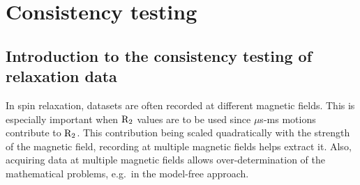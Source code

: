 


\chapter{Consistency testing}



\section{Introduction to the consistency testing of relaxation data}

In spin relaxation, datasets are often recorded at different magnetic fields.
This is especially important when $\mathrm{R}_2$ values are to be used since $\mu$s-ms motions contribute to $\mathrm{R}_2$.
This contribution being scaled quadratically with the strength of the magnetic field, recording at multiple magnetic fields helps extract it.
Also, acquiring data at multiple magnetic fields allows over-determination of the mathematical problems, e.g.\ in the model-free approach.

